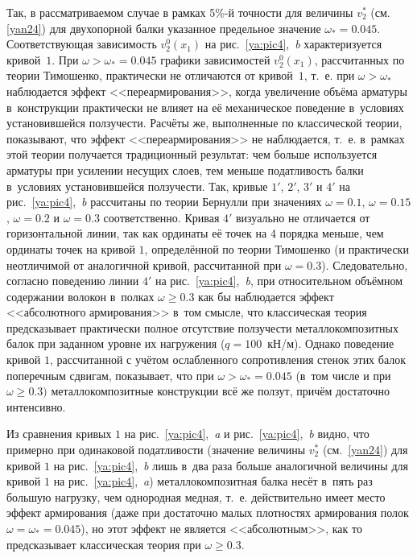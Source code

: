 Так, в рассматриваемом случае в рамках 5\%-й точности для величины $v_2^*$ (см. \eqref{yan24}) для двухопорной балки указанное предельное значение ${\omega_*=0.045}$. 
Соответствующая зависимость $v_2^0(x_1)$ на рис.~\ref{ya:pic4},~{\sl b} характеризуется кривой~$1$. 
При $\omega>\omega_*=0.045$ графики зависимостей $v_2^0(x_1)$, рассчитанных по теории Тимошенко, практически не отличаются от кривой~$1$, 
т.~е. при $\omega>\omega_*$ наблюдается эффект <<переармирования>>, когда увеличение объёма арматуры в~конструкции практически не влияет на её механическое поведение в~условиях установившейся ползучести. 
Расчёты же, выполненные по классической теории, показывают, что эффект <<переармирования>> не наблюдается, 
т.~е. в~рамках этой теории получается традиционный результат: 
чем больше используется арматуры при усилении несущих слоев, тем меньше податливость балки в~условиях установившейся ползучести. 
Так, кривые $1'$, $2'$, $3'$ и $4'$ на рис.~\ref{ya:pic4},~{\sl b} рассчитаны по теории Бернулли при значениях $\omega=0.1$, $\omega=0.15$, $\omega=0.2$ и $\omega=0.3$ соответственно. 
Кривая $4'$ визуально не отличается от горизонтальной линии, так как ординаты её точек на 4 порядка меньше, чем ординаты точек на кривой $1$, определённой по теории Тимошенко (и практически неотличимой от аналогичной кривой, рассчитанной при $\omega=0.3$). 
Следовательно, согласно поведению линии $4'$ на рис.~\ref{ya:pic4},~{\sl b}, при относительном объёмном содержании волокон в~полках $\omega\ge0.3$ как бы наблюдается эффект <<абсолютного армирования>> в~том смысле, что классическая теория предсказывает практически полное отсутствие ползучести металлокомпозитных балок при заданном уровне их нагружения ($q=100$~кН/м). 
Однако поведение кривой $1$, рассчитанной с учётом ослабленного сопротивления стенок этих балок поперечным сдвигам, показывает, что при $\omega>\omega_*=0.045$ (в~том числе и при $\omega\ge0.3)$ металлокомпозитные конструкции всё же ползут, причём достаточно интенсивно.

Из сравнения кривых $1$ на рис.~\ref{ya:pic4},~{\sl a} и рис.~\ref{ya:pic4},~{\sl b} видно, что примерно при одинаковой податливости (значение величины $v_2^*$ (см.~\eqref{yan24}) для кривой $1$ на рис.~\ref{ya:pic4},~{\sl b} лишь в~два раза больше аналогичной величины для кривой $1$ на рис.~\ref{ya:pic4},~{\sl a}) металлокомпозитная балка несёт в~пять раз большую нагрузку, чем однородная медная, т.~е. действительно имеет место эффект армирования (даже при достаточно малых плотностях армирования полок $\omega=\omega_*=0.045$), 
но этот эффект не является <<абсолютным>>, как то предсказывает классическая теория при $\omega\ge0.3$.

